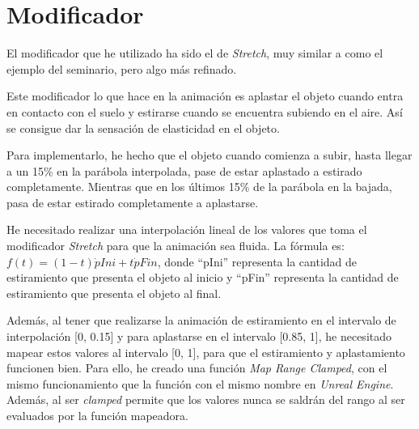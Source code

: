 \section{Modificador}

El modificador que he utilizado ha sido el de \textit{Stretch}, muy similar a como el ejemplo del seminario, pero algo más refinado.

\bigskip

Este modificador lo que hace en la animación es aplastar el objeto cuando entra en contacto con el suelo y estirarse cuando se encuentra subiendo en el aire. Así se consigue dar la sensación de elasticidad en el objeto.


Para implementarlo, he hecho que el objeto cuando comienza a subir, hasta llegar a un 15\% en la parábola interpolada, pase de estar aplastado a estirado completamente. Mientras que en los últimos 15\% de la parábola en la bajada, pasa de estar estirado completamente a aplastarse.

\bigskip

He necesitado realizar una interpolación lineal de los valores que toma el modificador \textit{Stretch} para que la animación sea fluida. La fórmula es: $f(t)=(1-t) \dot pIni + t \dot pFin$, donde ``pIni'' representa la cantidad de estiramiento que presenta el objeto al inicio y ``pFin'' representa la cantidad de estiramiento que presenta el objeto al final.

\bigskip

Además, al tener que realizarse la animación de estiramiento en el intervalo de interpolación [0, 0.15] y para aplastarse en el intervalo [0.85, 1], he necesitado mapear estos valores al intervalo [0, 1], para que el estiramiento y aplastamiento funcionen bien. Para ello, he creado una función \textit{Map Range Clamped}, con el mismo funcionamiento que la función con el mismo nombre en \textit{Unreal Engine}. Además, al ser \textit{clamped} permite que los valores nunca se saldrán del rango al ser evaluados por la función mapeadora.